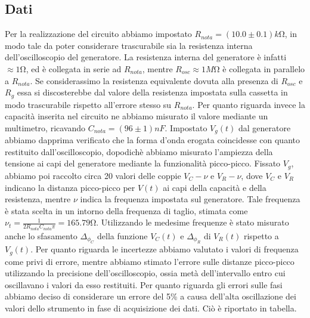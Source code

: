 \documentclass[a4paper]{article}
\begin{document}
\subsection{Dati}
Per la realizzazione del circuito abbiamo impostato $R_{nota} = (10.0\pm 0.1) k\si{\ohm}$, in modo tale da poter considerare trascurabile sia la resistenza interna dell'oscilloscopio del generatore. La resistenza interna del generatore è infatti $\approx 1\si{\ohm}$, ed è collegata in serie ad $R_{nota}$, mentre $R_{osc}\approx 1M\si{\ohm}$ è collegata in parallelo a $R_{nota}$. Se considerassimo la resistenza equivalente dovuta alla presenza di $R_{osc}$ e $R_g$ essa si discosterebbe dal valore della resistenza impostata sulla cassetta in modo trascurabile rispetto all'errore stesso su $R_{nota}$. 
Per quanto riguarda invece la capacità inserita nel circuito ne abbiamo misurato il valore mediante un multimetro, ricavando $C_{nota} = (96 \pm 1) nF $.
Impostato $V_g(t)$ dal generatore abbiamo dapprima verificato che la forma d'onda erogata coincidesse con quanto restituito dall'oscilloscopio, dopodichè abbiamo misurato l'ampiezza della tensione ai capi del generatore mediante la funzionalità picco-picco. Fissato $V_g$, abbiamo poi raccolto circa 20 valori delle coppie $V_C - \nu$ e $V_R - \nu$, dove $V_C$ e $V_R$ indicano la distanza picco-picco per $V(t)$ ai capi della capacità e della resistenza, mentre $\nu$ indica la frequenza impostata sul generatore. Tale frequenza è stata scelta in un intorno della frequenza di taglio, stimata come $\nu_t = \frac{1}{2R_{nota}C_{nota}\pi}= 165.79 \si{\ohm}$. Utilizzando le medesime frequenze è stato misurato anche lo sfasamento $\Delta_{\phi_C}$ della funzione $V_C(t)$ e $\Delta_{\phi_R}$ di $V_R(t)$ rispetto a $V_g(t)$. Per quanto riguarda le incertezze abbiamo valutato i valori di frequenza come privi di errore, mentre abbiamo stimato l'errore sulle distanze picco-picco utilizzando la precisione dell'oscilloscopio, ossia metà dell'intervallo entro cui oscillavano i valori da esso restituiti.  Per quanto riguarda gli errori sulle fasi abbiamo deciso di considerare un errore del 5\% a causa dell'alta oscillazione dei valori dello strumento in fase di acquisizione dei dati. Ciò è riportato in tabella. 
\end{document}
